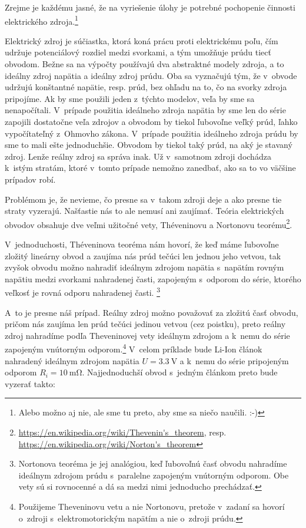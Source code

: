 Zrejme je každému jasné, že na vyriešenie úlohy je potrebné pochopenie
činnosti elektrického zdroja.\footnote{Alebo možno aj nie, ale sme tu preto, aby sme sa niečo naučili. :-)}

Elektrický zdroj je súčiastka, ktorá koná prácu proti elektrickému
poľu, čím udržuje potenciálový rozdiel medzi svorkami, a tým umožňuje
prúdu tiecť obvodom. Bežne sa na výpočty používajú dva abstraktné
modely zdroja, a to ideálny zdroj napätia a ideálny zdroj prúdu. Oba
sa vyznačujú tým, že v~obvode udržujú konštantné napätie, resp. prúd,
bez ohľadu na to, čo na svorky zdroja pripojíme. Ak by sme použili
jeden z~týchto modelov, veľa by sme sa nenapočítali. V~prípade použitia
ideálneho zdroja napätia by sme len do série zapojili dostatočne veľa
zdrojov a obvodom by tiekol ľubovoľne veľký prúd, ľahko vypočítateľný
z~Ohmovho zákona. V~prípade použitia ideálneho zdroja prúdu by sme
to mali ešte jednoduchšie. Obvodom by tiekol taký prúd, na aký je
stavaný zdroj. Lenže reálny zdroj sa správa inak. Už v~samotnom zdroji
dochádza k~istým stratám, ktoré v~tomto prípade nemožno zanedbať,
ako sa to vo väčšine prípadov robí.

Problémom je, že nevieme, čo presne sa v~takom zdroji deje a ako presne
tie straty vyzerajú. Našťastie nás to ale nemusí ani zaujímať. Teória
elektrických obvodov obsahuje dve veľmi užitočné vety, Théveninovu
a Nortonovu teorému\footnote{\url{https://en.wikipedia.org/wiki/Thevenin's\_theorem}, resp.
\url{https://en.wikipedia.org/wiki/Norton's\_theorem}}. 

V~jednoduchosti, Théveninova teoréma nám hovorí, že keď máme ľubovoľne
zložitý lineárny obvod a zaujíma nás prúd tečúci len jednou jeho vetvou,
tak zvyšok obvodu možno nahradiť ideálnym zdrojom napätia s~napätím rovným 
napätiu medzi svorkami nahradenej časti, zapojeným s~odporom do série,
ktorého veľkosť je rovná odporu nahradenej časti.
\footnote{Nortonova teoréma je jej analógiou, keď ľubovoľnú časť obvodu nahradíme 
ideálnym zdrojom prúdu s~paralelne zapojeným vnútorným odporom. Obe
vety sú si rovnocenné a dá sa medzi nimi jednoducho prechádzať.} 

A~to je presne náš prípad. Reálny zdroj možno považovať za zložitú
časť obvodu, pričom nás zaujíma len prúd tečúci jedinou vetvou (cez
poistku), preto reálny zdroj nahradíme podľa Theveninovej vety ideálnym
zdrojom a k~nemu do série zapojeným vnútorným odporom.\footnote{Použijeme Theveninovu vetu a nie Nortonovu, pretože v~zadaní sa hovorí o~zdroji s~elektromotorickým napätím a nie o~zdroji prúdu.} V~celom príklade bude Li-Ion článok nahradený ideálnym zdrojom napätia
$U=\SI{3.3}{\volt}$ a k~nemu do série pripojeným odporom $R_{i}=\SI{10}{\milli\ohm}$.
Najjednoduchší obvod s~jedným článkom preto bude vyzerať takto:

